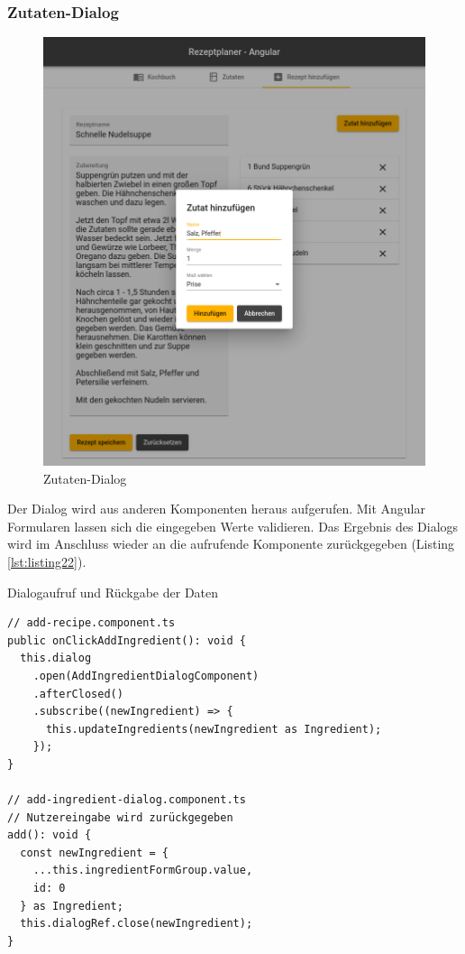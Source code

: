 \subsubsection{Zutaten-Dialog}
\begin{figure}
  \centering
  \includegraphics[scale=0.5]{Grafiken/03_Implementation/Dialog_Angular.png}
  \caption{Zutaten-Dialog}
  \label{fig:dialog_angular}
\end{figure}

Der Dialog wird aus anderen Komponenten heraus aufgerufen. Mit Angular Formularen lassen sich die eingegeben Werte validieren. Das Ergebnis des Dialogs wird im Anschluss wieder an die aufrufende Komponente zurückgegeben (Listing \ref{lst:listing22}).

\begin{listing}
\caption{Dialogaufruf und Rückgabe der Daten}
\label{lst:listing22}
\begin{verbatim}
// add-recipe.component.ts
public onClickAddIngredient(): void {
  this.dialog
    .open(AddIngredientDialogComponent)
    .afterClosed()
    .subscribe((newIngredient) => {
      this.updateIngredients(newIngredient as Ingredient);
    });
}

// add-ingredient-dialog.component.ts
// Nutzereingabe wird zurückgegeben
add(): void {
  const newIngredient = {
    ...this.ingredientFormGroup.value,
    id: 0
  } as Ingredient;
  this.dialogRef.close(newIngredient);
}
\end{verbatim}
\end{listing}

